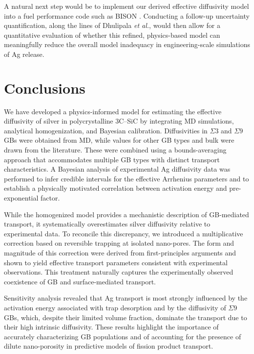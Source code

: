 \documentclass[%
preprint,
amsmath,amssymb,
aps,
]{revtex4-2}
\newcommand{\?}{\stackrel{?}{=}}
\begin{document}
A natural next step would be to implement our derived effective diffusivity model into a fuel performance code such as BISON \cite{Williamson2021}. Conducting a follow-up uncertainty quantification, along the lines of Dhulipala \textit{et al.}, would then allow for a quantitative evaluation of whether this refined, physics-based model can meaningfully reduce the overall model inadequacy in engineering-scale simulations of Ag release.

\section{Conclusions}

We have developed a physics-informed model for estimating the effective diffusivity of silver in polycrystalline 3C–SiC by integrating MD simulations, analytical homogenization, and Bayesian calibration. Diffusivities in $\Sigma 3$ and $\Sigma 9$ GBs were obtained from MD, while values for other GB types and bulk were drawn from the literature. These were combined using a bounds-averaging approach that accommodates multiple GB types with distinct transport characteristics. A Bayesian analysis of experimental Ag diffusivity data was performed to infer credible intervals for the effective Arrhenius parameters and to establish a physically motivated correlation between activation energy and pre-exponential factor.

While the homogenized model provides a mechanistic description of GB-mediated transport, it systematically overestimates silver diffusivity relative to experimental data. To reconcile this discrepancy, we introduced a multiplicative correction based on reversible trapping at isolated nano-pores. The form and magnitude of this correction were derived from first-principles arguments and shown to yield effective transport parameters consistent with experimental observations. This treatment naturally captures the experimentally observed coexistence of GB and surface-mediated transport.

Sensitivity analysis revealed that Ag transport is most strongly influenced by the activation energy associated with trap desorption and by the diffusivity of $\Sigma 9$ GBs, which, despite their limited volume fraction, dominate the transport due to their high intrinsic diffusivity. These results highlight the importance of accurately characterizing GB populations and of accounting for the presence of dilute nano-porosity in predictive models of fission product transport.
\end{document}
